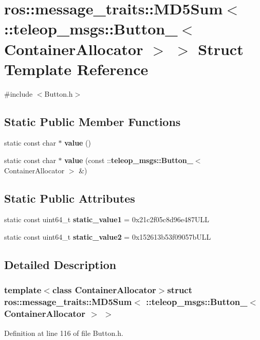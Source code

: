 \section{ros::message\_\-traits::MD5Sum$<$ ::teleop\_\-msgs::Button\_\-$<$ ContainerAllocator $>$ $>$ Struct Template Reference}
\label{structros_1_1message__traits_1_1MD5Sum_3_01_1_1teleop__msgs_1_1Button___3_01ContainerAllocator_01_4_01_4}


{\ttfamily \#include $<$Button.h$>$}

\subsection*{Static Public Member Functions}
\begin{DoxyCompactItemize}
\item 
static const char $\ast$ {\bf value} ()
\item 
static const char $\ast$ {\bf value} (const ::{\bf teleop\_\-msgs::Button\_\-}$<$ ContainerAllocator $>$ \&)
\end{DoxyCompactItemize}
\subsection*{Static Public Attributes}
\begin{DoxyCompactItemize}
\item 
static const uint64\_\-t {\bf static\_\-value1} = 0x21c2f05c8d96e487ULL
\item 
static const uint64\_\-t {\bf static\_\-value2} = 0x152613b53f09057bULL
\end{DoxyCompactItemize}


\subsection{Detailed Description}
\subsubsection*{template$<$class ContainerAllocator$>$struct ros::message\_\-traits::MD5Sum$<$ ::teleop\_\-msgs::Button\_\-$<$ ContainerAllocator $>$ $>$}



Definition at line 116 of file Button.h.



